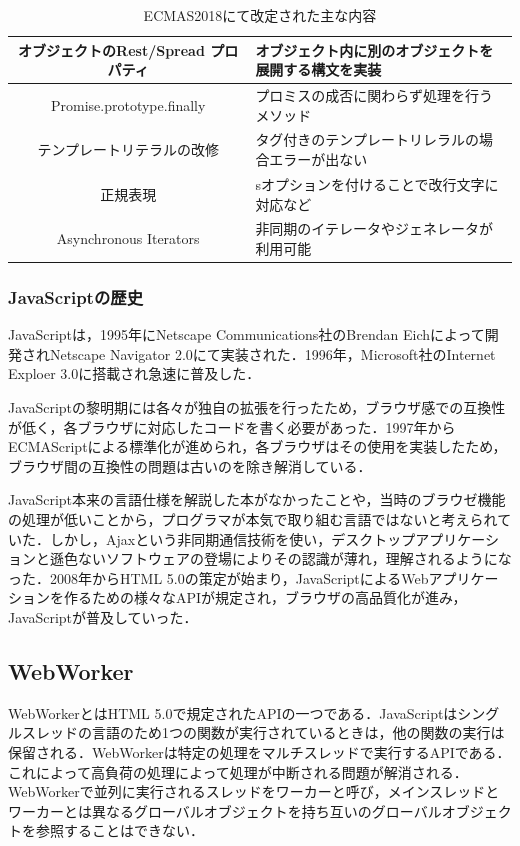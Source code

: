 \documentclass[a4j,12pt]{jsarticle}
\begin{document}
\begin{table} [h]
\centering
\caption{ECMAS2018にて改定された主な内容}
	\begin{tabular} {| c | l |} \hline
	オブジェクトのRest/Spread プロパティ &  オブジェクト内に別のオブジェクトを展開する構文を実装\\ \hline
	Promise.prototype.finally &  プロミスの成否に関わらず処理を行うメソッド\\ \hline
	テンプレートリテラルの改修 &  タグ付きのテンプレートリレラルの場合エラーが出ない\\ \hline
	正規表現 & sオプションを付けることで改行文字に対応など \\ \hline
	Asynchronous Iterators & 非同期のイテレータやジェネレータが利用可能 \\ \hline
	\end{tabular} 
	\label{tab:EC2018}
\end{table}

\subsubsection{JavaScriptの歴史}
JavaScriptは，1995年にNetscape Communications社のBrendan Eichによって開発されNetscape Navigator 2.0にて実装された．1996年，Microsoft社のInternet Exploer 3.0に搭載され急速に普及した．

JavaScriptの黎明期には各々が独自の拡張を行ったため，ブラウザ感での互換性が低く，各ブラウザに対応したコードを書く必要があった．1997年からECMAScriptによる標準化が進められ，各ブラウザはその使用を実装したため，ブラウザ間の互換性の問題は古いのを除き解消している．

JavaScript本来の言語仕様を解説した本がなかったことや，当時のブラウゼ機能の処理が低いことから，プログラマが本気で取り組む言語ではないと考えられていた．しかし，Ajaxという非同期通信技術を使い，デスクトップアプリケーションと遜色ないソフトウェアの登場によりその認識が薄れ，理解されるようになった．2008年からHTML 5.0の策定が始まり，JavaScriptによるWebアプリケーションを作るための様々なAPIが規定され，ブラウザの高品質化が進み，JavaScriptが普及していった．

\subsection{WebWorker}
WebWorkerとはHTML 5.0で規定されたAPIの一つである．JavaScriptはシングルスレッドの言語のため1つの関数が実行されているときは，他の関数の実行は保留される．WebWorkerは特定の処理をマルチスレッドで実行するAPIである．これによって高負荷の処理によって処理が中断される問題が解消される．WebWorkerで並列に実行されるスレッドをワーカーと呼び，メインスレッドとワーカーとは異なるグローバルオブジェクトを持ち互いのグローバルオブジェクトを参照することはできない．
\end{document}

